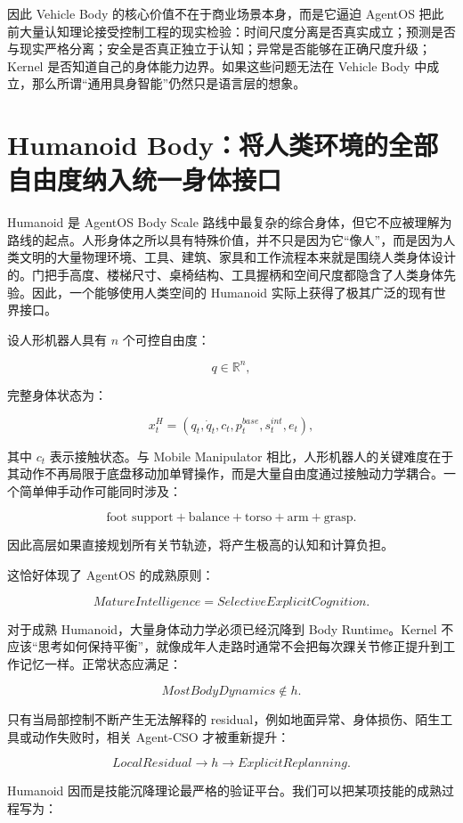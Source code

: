 因此 Vehicle Body 的核心价值不在于商业场景本身，而是它逼迫 AgentOS 把此前大量认知理论接受控制工程的现实检验：时间尺度分离是否真实成立；预测是否与现实严格分离；安全是否真正独立于认知；异常是否能够在正确尺度升级；Kernel 是否知道自己的身体能力边界。如果这些问题无法在 Vehicle Body 中成立，那么所谓“通用具身智能”仍然只是语言层的想象。

\section{Humanoid Body：将人类环境的全部自由度纳入统一身体接口}

Humanoid 是 AgentOS Body Scale 路线中最复杂的综合身体，但它不应被理解为路线的起点。人形身体之所以具有特殊价值，并不只是因为它“像人”，而是因为人类文明的大量物理环境、工具、建筑、家具和工作流程本来就是围绕人类身体设计的。门把手高度、楼梯尺寸、桌椅结构、工具握柄和空间尺度都隐含了人类身体先验。因此，一个能够使用人类空间的 Humanoid 实际上获得了极其广泛的现有世界接口。

设人形机器人具有 $n$ 个可控自由度：

$$
q\in\mathbb R^n,
$$

完整身体状态为：

$$
x_t^H=
(q_t,\dot q_t,
c_t,
p_t^{base},
s_t^{int},
e_t),
$$

其中 $c_t$ 表示接触状态。与 Mobile Manipulator 相比，人形机器人的关键难度在于其动作不再局限于底盘移动加单臂操作，而是大量自由度通过接触动力学耦合。一个简单伸手动作可能同时涉及：

$$
\text{foot support}
+
\text{balance}
+
\text{torso}
+
\text{arm}
+
\text{grasp}.
$$

因此高层如果直接规划所有关节轨迹，将产生极高的认知和计算负担。

这恰好体现了 AgentOS 的成熟原则：

$$
\boxed{
MatureIntelligence=SelectiveExplicitCognition.
}
$$

对于成熟 Humanoid，大量身体动力学必须已经沉降到 Body Runtime。Kernel 不应该“思考如何保持平衡”，就像成年人走路时通常不会把每次踝关节修正提升到工作记忆一样。正常状态应满足：

$$
MostBodyDynamics\notin h.
$$

只有当局部控制不断产生无法解释的 residual，例如地面异常、身体损伤、陌生工具或动作失败时，相关 Agent-CSO 才被重新提升：

$$
LocalResidual
\rightarrow
h
\rightarrow
ExplicitReplanning.
$$

Humanoid 因而是技能沉降理论最严格的验证平台。我们可以把某项技能的成熟过程写为：

